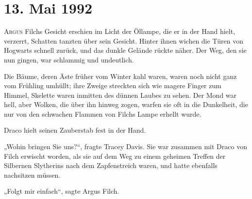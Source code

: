 
\section{13. Mai 1992}

\lettrine{A}{rgus} Filchs Gesicht erschien im Licht der Öllampe, die er in der Hand hielt, verzerrt, Schatten tanzten über sein Gesicht. Hinter ihnen wichen die Türen von Hogwarts schnell zurück, und das dunkle Gelände rückte näher. Der Weg, den sie nun gingen, war schlammig und undeutlich.

Die Bäume, deren Äste früher vom Winter kahl waren, waren noch nicht ganz vom Frühling umhüllt; ihre Zweige streckten sich wie magere Finger zum Himmel, Skelette waren inmitten des dünnen Laubes zu sehen. Der Mond war hell, aber Wolken, die über ihn hinweg zogen, warfen sie oft in die Dunkelheit, die nur von den schwachen Flammen von Filchs Lampe erhellt wurde.

Draco hielt seinen Zauberstab fest in der Hand.

„Wohin bringen Sie uns?“, fragte Tracey Davis. Sie war zusammen mit Draco von Filch erwischt worden, als sie auf dem Weg zu einem geheimen Treffen der Silbernen Slytherins nach dem Zapfenstreich waren, und hatte ebenfalls nachsitzen müssen.

„Folgt mir einfach“, sagte Argus Filch.

